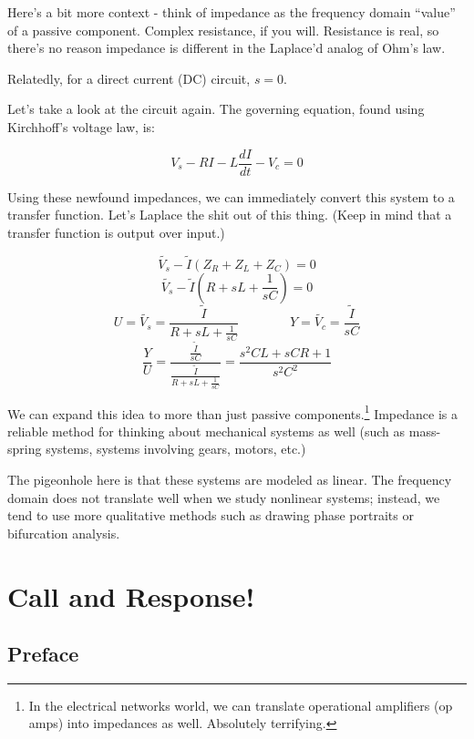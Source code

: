\documentclass{report}
\begin{document}
\begin{onehalfspacing}
\begin{flushleft}
Here's a bit more context - think of impedance as the frequency domain ``value'' of a passive component. Complex resistance, if you will. Resistance is real, so there's no reason impedance is different in the Laplace'd analog of Ohm's law.

\medskip

Relatedly, for a direct current (DC) circuit, \(s=0\).

\medskip

Let's take a look at the circuit again. The governing equation, found using Kirchhoff's voltage law, is:

\vspace{-0.1in}
\[V_s - RI - L \frac{dI}{dt} - V_c = 0\]

Using these newfound impedances, we can immediately convert this system to a transfer function. Let's Laplace the shit out of this thing. (Keep in mind that a transfer function is output over input.)

\vspace{-0.1in}
\[\tilde{V_s} - \tilde{I} (Z_R + Z_L + Z_C) = 0\]
\[\tilde{V_s} - \tilde{I} (R + sL + \frac{1}{sC}) = 0\]
\[U = \tilde{V_s} = \frac{\tilde{I}}{R + sL + \frac{1}{sC}}\qquad \qquad Y = \tilde{V_c} = \frac{\tilde{I}}{sC}\]
\[\frac{Y}{U} = \frac{\frac{\tilde{I}}{sC}}{\frac{\tilde{I}}{R + sL + \frac{1}{sC}}} = \frac{s^2 CL + sCR + 1}{s^2 C^2}\]

We can expand this idea to more than just passive components.\footnote{In the electrical networks world, we can translate operational amplifiers (op amps) into impedances as well. Absolutely terrifying.} Impedance is a reliable method for thinking about mechanical systems as well (such as mass-spring systems, systems involving gears, motors, etc.)

\medskip

The pigeonhole here is that these systems are modeled as linear. The frequency domain does not translate well when we study nonlinear systems; instead, we tend to use more qualitative methods such as drawing phase portraits or bifurcation analysis.

\chapter{Call and Response!}

\section*{Preface}


\end{flushleft}
\end{onehalfspacing}
\end{document}
